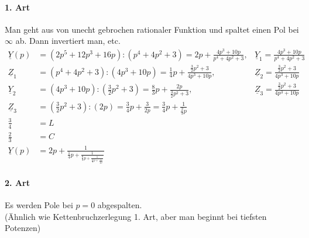 \paragraph{1. Art}
Man geht aus von unecht gebrochen rationaler Funktion und
spaltet einen Pol bei $\infty$ ab. Dann invertiert man, etc.
\begin{align}
	\underline{Y}(p)&=\left(2p^5+12p^3+16p\right):\left(p^4+4p^2+3\right)=2p+\frac{4p^3+10p}{p^4+4p^2+3},
	&\underline{Y}_1=\frac{4p^3+10p}{p^4+4p^2+3}\nonumber\\
	\underline{Z}_1&=\left(p^4+4p^2+3\right):\left(4p^3+10p\right)=\frac{1}{4}p+\frac{\frac{3}{2}p^2+3}{4p^3+10p},
	&\underline{Z}_2=\frac{\frac{3}{2}p^2+3}{4p^3+10p}\nonumber\\
	\underline{Y}_2&=\left(4p^3+10p\right):\left(\frac{3}{2}p^2+3\right)=\frac{8}{3}p+\frac{2p}{\frac{3}{2}p^2+3},
	&\underline{Z}_3=\frac{\frac{3}{2}p^2+3}{4p^3+10p}\nonumber\\
	\underline{Z}_3&=\left(\frac{3}{2}p^2+3\right):\left(2p\right)=\frac{3}{4}p+\frac{3}{2p}=\frac{3}{4}p+\frac{1}{\frac{2}{3}p}\nonumber\\
	\frac{3}{4}&=L\nonumber\\
	\frac{2}{3}&=C\nonumber\\
	\underline{Y}(p)&=2p+\frac{1}{\frac{1}{4}p+\frac{1}{\frac{8}{3}p+\frac{1}{\frac{3}{4}p+\frac{1}{\frac{2}{3}p}}}}\nonumber
\end{align}

\paragraph{2. Art}
Es werden Pole bei $p=0$ abgespalten.\\
(Ähnlich wie Kettenbruchzerlegung 1. Art,
aber man beginnt bei tiefsten Potenzen)


